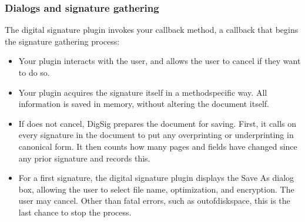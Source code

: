 \documentclass[letterpaper,12pt,english,openany,oneside]{sphinxmanual}
\begin{document}
\subsubsection{Dialogs and signature gathering}
\label{\detokenize{Plugins_ExtendedAPI:dialogs-and-signature-gathering}}
The digital signature plugin invokes your  callback method, a callback that begins the signature gathering process:
\begin{itemize}
\item {} 
Your plugin interacts with the user, and allows the user to cancel if they want to do so.

\item {} 
Your plugin acquires the signature itself in a method\sphinxhyphen{}specific way. All information is saved in memory, without altering the document itself.

\item {} 
If  does not cancel, DigSig prepares the document for saving. First, it calls  on every signature in the document to put any overprinting or underprinting in canonical form. It then counts how many pages and fields have changed since any prior signature and records this.

\item {} 
For a first signature, the digital signature plugin displays the Save As dialog box, allowing the user to select file name, optimization, and encryption. The user may cancel. Other than fatal errors, such as out\sphinxhyphen{}of\sphinxhyphen{}disk\sphinxhyphen{}space, this is the last chance to stop the process.

\end{itemize}
\end{document}

